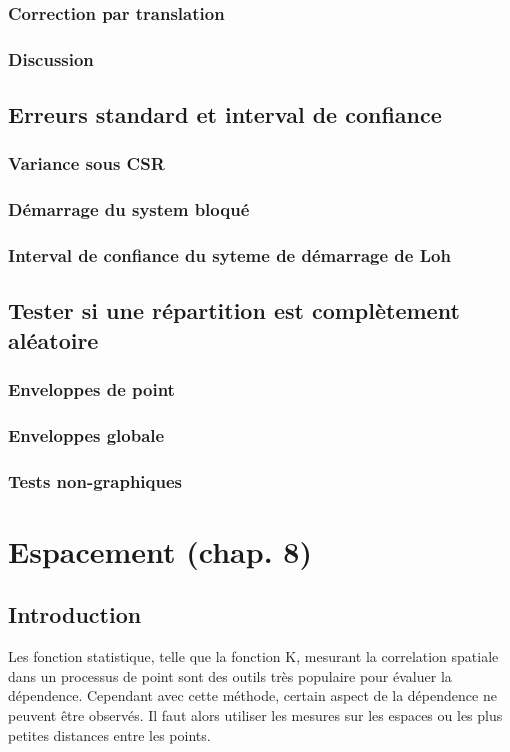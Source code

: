 \documentclass[french,12pt,a4paper]{report}
\begin{document}
\subsection{Correction par translation}
\subsection{Discussion}

\section{Erreurs standard et interval de confiance}
\subsection{Variance sous CSR}
\subsection{Démarrage du system bloqué}
\subsection{Interval de confiance du syteme de démarrage de Loh}

\section{Tester si une répartition est complètement aléatoire}
\subsection{Enveloppes de point}
\subsection{Enveloppes globale}
\subsection{Tests non-graphiques}


\chapter{Espacement (chap. 8)}

\section{Introduction}
Les fonction statistique, telle que la fonction K, mesurant la correlation spatiale dans un processus de point sont des outils très populaire pour évaluer la dépendence. Cependant avec cette méthode, certain aspect de la dépendence ne peuvent être observés. Il faut alors utiliser les mesures sur les espaces ou les plus petites distances entre les points.
\end{document}
